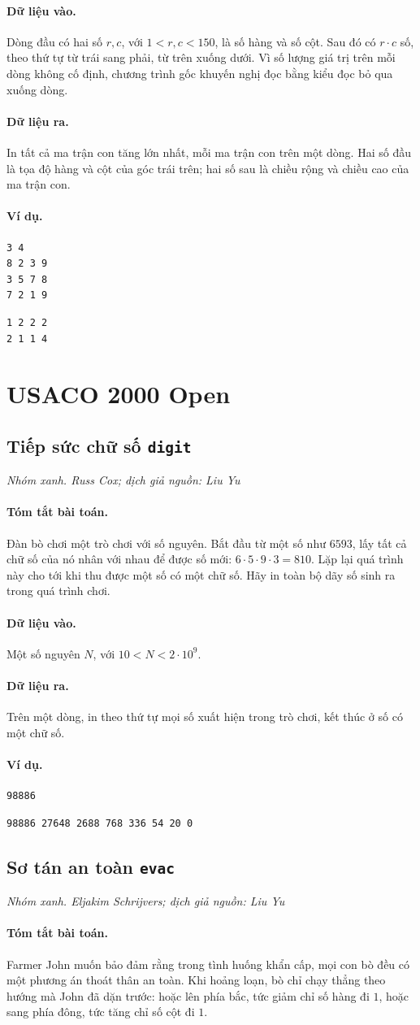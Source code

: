 \documentclass[11pt]{article}
\newcommand{\problem}[4]{%
  \subsection[#1 (#2)]{#1 \hfill {\normalsize\texttt{#2}}}%
  \noindent\textit{#3. #4}\par\smallskip
}
\newcommand{\iosec}[1]{\paragraph{#1}}
\begin{document}
\iosec{Dữ liệu vào.}
Dòng đầu có hai số \(r,c\), với \(1<r,c<150\), là số hàng và số cột. Sau đó có
\(r\cdot c\) số, theo thứ tự từ trái sang phải, từ trên xuống dưới. Vì số lượng
giá trị trên mỗi dòng không cố định, chương trình gốc khuyến nghị đọc bằng
kiểu đọc bỏ qua xuống dòng.

\iosec{Dữ liệu ra.}
In tất cả ma trận con tăng lớn nhất, mỗi ma trận con trên một dòng. Hai số đầu
là tọa độ hàng và cột của góc trái trên; hai số sau là chiều rộng và chiều cao
của ma trận con.

\iosec{Ví dụ.}
\begin{verbatim}
3 4
8 2 3 9
3 5 7 8
7 2 1 9
\end{verbatim}

\begin{verbatim}
1 2 2 2
2 1 1 4
\end{verbatim}

\section{USACO 2000 Open}

\problem{Tiếp sức chữ số}{digit}{Nhóm xanh}{Russ Cox; dịch giả nguồn: Liu Yu}

\iosec{Tóm tắt bài toán.}
Đàn bò chơi một trò chơi với số nguyên. Bắt đầu từ một số như \(6593\), lấy
tất cả chữ số của nó nhân với nhau để được số mới: \(6\cdot5\cdot9\cdot3=810\).
Lặp lại quá trình này cho tới khi thu được một số có một chữ số. Hãy in toàn
bộ dãy số sinh ra trong quá trình chơi.

\iosec{Dữ liệu vào.}
Một số nguyên \(N\), với \(10<N<2\cdot 10^9\).

\iosec{Dữ liệu ra.}
Trên một dòng, in theo thứ tự mọi số xuất hiện trong trò chơi, kết thúc ở số
có một chữ số.

\iosec{Ví dụ.}
\begin{verbatim}
98886
\end{verbatim}

\begin{verbatim}
98886 27648 2688 768 336 54 20 0
\end{verbatim}

\problem{Sơ tán an toàn}{evac}{Nhóm xanh}{Eljakim Schrijvers; dịch giả nguồn: Liu Yu}

\iosec{Tóm tắt bài toán.}
Farmer John muốn bảo đảm rằng trong tình huống khẩn cấp, mọi con bò đều có một
phương án thoát thân an toàn. Khi hoảng loạn, bò chỉ chạy thẳng theo hướng mà
John đã dặn trước: hoặc lên phía bắc, tức giảm chỉ số hàng đi \(1\), hoặc sang
phía đông, tức tăng chỉ số cột đi \(1\).
\end{document}
